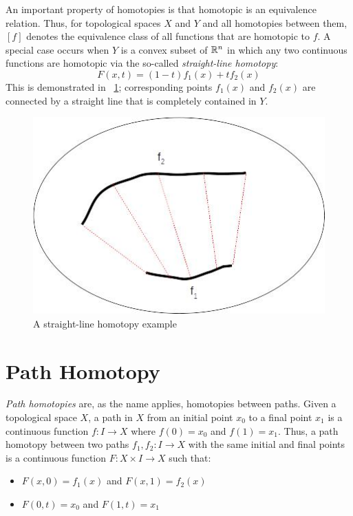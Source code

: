 \documentclass[letterpaper,12pt,fleqn]{article}
\begin{document}
An important property of homotopies is that homotopic is an equivalence relation.  Thus, for topological spaces
\(X\) and \(Y\) and all homotopies between them, \([f]\) denotes the equivalence class of all functions that are
homotopic to \(f\).  A special case occurs when \(Y\) is a convex subset of \(\mathbb{R}^n\) in which any two continuous
functions are homotopic via the so-called \emph{straight-line homotopy}:
\[F(x,t)=(1-t)f_1(x)+tf_2(x)\]
This is demonstrated in \figurename\ \ref{fig:slhomotopy}; corresponding points \(f_1(x)\) and \(f_2(x)\) are
connected by a straight line that is completely contained in \(Y\).

\begin{figure}[H]
  \centering
  \includegraphics[scale=0.4]{slhomotopy}
  \caption{A straight-line homotopy example}
  \label{fig:slhomotopy}
\end{figure}

\section*{Path Homotopy}

\emph{Path homotopies} are, as the name applies, homotopies between paths.  Given a topological space \(X\), a
path in \(X\) from an initial point \(x_0\) to a final point \(x_1\) is a continuous function \(f:I\to X\) where
\(f(0)=x_0\) and \(f(1)=x_1\).  Thus, a path homotopy between two paths \(f_1,f_2:I\to X\) with the same initial
and final points is a continuous function \(F:X\times I\to X\) such that:

\begin{itemize}
\item \(F(x,0)=f_1(x)\) and \(F(x,1)=f_2(x)\)
\item \(F(0,t)=x_0\) and \(F(1,t)=x_1\)
\end{itemize}
\end{document}

